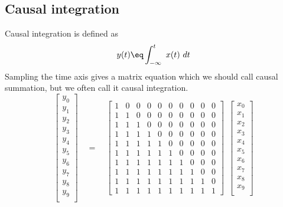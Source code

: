 \subsection{Causal integration}
Causal integration is defined as
\begin{equation}
y(t) \eq \int_{-\infty}^t \ x(t)\ dt
\end{equation}
Sampling the time axis gives a matrix equation which
we should call causal summation, but we often call it causal integration.
\begin{equation}
  \left[
	\begin{array}{c}
		y_0 \\
		y_1 \\
		y_2 \\
		y_3 \\
		y_4 \\
		y_5 \\
		y_6 \\
		y_7 \\
		y_8 \\
		y_9 \\
	\end{array}
  \right]
 \quad = \quad
  \left[
	\begin{array}{ccccccccccc}
	1 &0 &0 &0 &0 &0 &0 &0 &0 &0 \\
	1 &1 &0 &0 &0 &0 &0 &0 &0 &0 \\
	1 &1 &1 &0 &0 &0 &0 &0 &0 &0 \\
	1 &1 &1 &1 &0 &0 &0 &0 &0 &0 \\
	1 &1 &1 &1 &1 &0 &0 &0 &0 &0 \\
	1 &1 &1 &1 &1 &1 &0 &0 &0 &0 \\
	1 &1 &1 &1 &1 &1 &1 &0 &0 &0 \\
	1 &1 &1 &1 &1 &1 &1 &1 &0 &0 \\
	1 &1 &1 &1 &1 &1 &1 &1 &1 &0 \\
	1 &1 &1 &1 &1 &1 &1 &1 &1 &1
	\end{array}
  \right]
  \ \
  \left[
	\begin{array}{c}
		x_0 \\
		x_1 \\
		x_2 \\
		x_3 \\
		x_4 \\
		x_5 \\
		x_6 \\
		x_7 \\
		x_8 \\
		x_9 \\
	\end{array}
  \right]
\label{eqn:mytri}
\end{equation}
